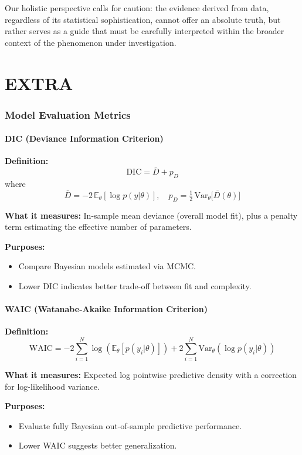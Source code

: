 \documentclass{Configuration_Files/PoliMi3i_thesis}
\begin{document}
Our holistic perspective calls for caution: the evidence derived from data, regardless of its statistical sophistication, cannot offer an absolute truth, but rather serves as a guide that must be carefully interpreted within the broader context of the phenomenon under investigation.


\chapter{EXTRA}
\label{chap:metrics}
\subsection{Model Evaluation Metrics}
\subsubsection{DIC (Deviance Information Criterion)}

\vspace{0.5em}

\textbf{Definition:}
\[
\text{DIC} = \bar{D} + p_D
\]
where
\[
\bar{D} = -2 \, \mathbb{E}_{\theta}[\log p(y | \theta)], \quad p_D = \tfrac{1}{2}\,\overline{\mathrm{Var}_\theta\bigl[D(\theta)\bigr]} %
\]

\textbf{What it measures:}  
In-sample mean deviance (overall model fit), plus a penalty term estimating the effective number of parameters.

\textbf{Purposes:}
\begin{itemize}
  \item Compare Bayesian models estimated via MCMC.
  \item Lower DIC indicates better trade-off between fit and complexity.
\end{itemize}

\subsubsection{WAIC (Watanabe-Akaike Information Criterion)}
\vspace{0.5em}
\textbf{Definition:}
\[
\text{WAIC} = -2 \sum_{i=1}^N \log \left( \mathbb{E}_{\theta}[p(y_i | \theta)] \right) + 2 \sum_{i=1}^N \text{Var}_{\theta} \left( \log p(y_i | \theta) \right)
\]

\textbf{What it measures:}  
Expected log pointwise predictive density with a correction for log-likelihood variance.

\textbf{Purposes:}
\begin{itemize}
  \item Evaluate fully Bayesian out-of-sample predictive performance.
  \item Lower WAIC suggests better generalization.
\end{itemize}
\end{document}
